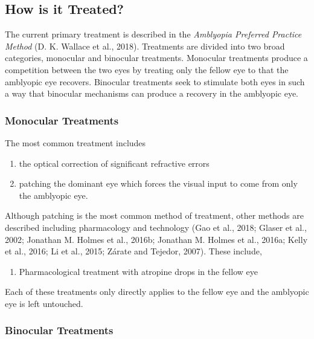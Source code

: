 \documentclass[
  onecolumn]{article}
\providecommand{\tightlist}{%
  \setlength{\itemsep}{0pt}\setlength{\parskip}{0pt}}
\begin{document}
\hypertarget{how-is-it-treated}{%
\subsection{How is it Treated?}\label{how-is-it-treated}}

The current primary treatment is described in the \emph{Amblyopia
Preferred Practice Method} (D. K. Wallace et al., 2018). Treatments are
divided into two broad categories, monocular and binocular treatments.
Monocular treatments produce a competition between the two eyes by
treating only the fellow eye to that the amblyopic eye recovers.
Binocular treatments seek to stimulate both eyes in such a way that
binocular mechanisms can produce a recovery in the amblyopic eye.

\hypertarget{monocular-treatments}{%
\subsubsection{Monocular Treatments}\label{monocular-treatments}}

The most common treatment includes

\begin{enumerate}
\def\labelenumi{\arabic{enumi}.}
\tightlist
\item
  the optical correction of significant refractive errors
\item
  patching the dominant eye which forces the visual input to come from
  only the amblyopic eye.
\end{enumerate}

Although patching is the most common method of treatment, other methods
are described including pharmacology and technology (Gao et al., 2018;
Glaser et al., 2002; Jonathan M. Holmes et al., 2016b; Jonathan M.
Holmes et al., 2016a; Kelly et al., 2016; Li et al., 2015; Zárate and
Tejedor, 2007). These include,

\begin{enumerate}
\def\labelenumi{\arabic{enumi}.}
\setcounter{enumi}{2}
\tightlist
\item
  Pharmacological treatment with atropine drops in the fellow eye
\end{enumerate}

Each of these treatments only directly applies to the fellow eye and the
amblyopic eye is left untouched.

\hypertarget{binocular-treatments}{%
\subsubsection{Binocular Treatments}\label{binocular-treatments}}
\end{document}
